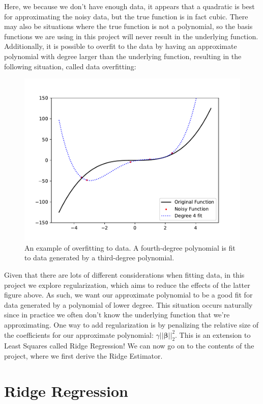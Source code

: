 \documentclass{article}
\newcommand{\B}{\boldsymbol\beta} %
\begin{document}
Here, we because we don't have enough data, it appears that a quadratic is best for approximating the noisy data, but the true function is in fact cubic. There may also be situations where the true function is not a polynomial, so the basis functions we are using in this project will never result in the underlying function. Additionally, it is possible to overfit to the data by having an approximate polynomial with degree larger than the underlying function, resulting in the following situation, called data overfitting:

\begin{figure}[H]
    \centering
    \includegraphics[width=12cm]{../Images/intro_3.pdf}
    \caption{An example of overfitting to data. A fourth-degree polynomial is fit to data generated by a third-degree polynomial.}
\end{figure}

Given that there are lots of different considerations when fitting data, in this project we explore regularization, which aims to reduce the effects of the latter figure above. As such, we want our approximate polynomial to be a good fit for data generated by a polynomial of lower degree. This situation occurs naturally since in practice we often don't know the underlying function that we're approximating. One way to add regularization is by penalizing the relative size of the coefficients for our approximate polynomial: $\gamma||\B||_{2}^{2}$. This is an extension to Least Squares called Ridge Regression! We can now go on to the contents of the project, where we first derive the Ridge Estimator.

\section{Ridge Regression}
\end{document}
